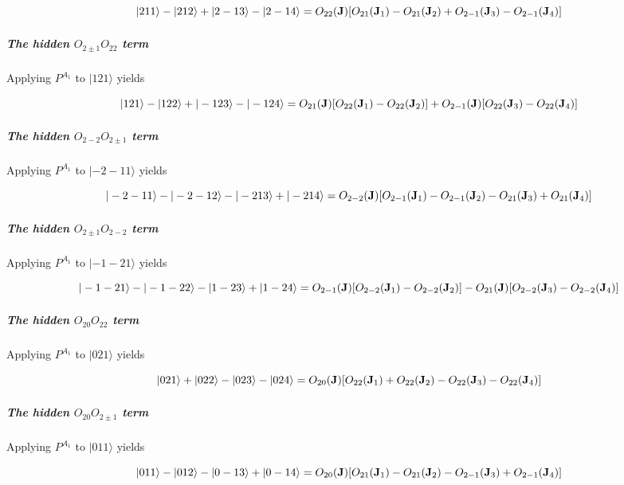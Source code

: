 \begin{equation}\label{nn211}
|211\rangle-|212\rangle+|2-13\rangle-|2-14\rangle =
O_{22}(\mathbf J)[O_{21}(\mathbf J_1)-O_{21}(\mathbf J_2)+O_{2-1}(\mathbf J_3)-O_{2-1}(\mathbf J_4)]
\end{equation}
   

\subparagraph{The hidden $O_{2\pm1}O_{22}$ term}

Applying $P^{A_1}$ to $|121\rangle$ yields 

\begin{equation}\label{nn121}
|121\rangle-|122\rangle+|-123\rangle-|-124\rangle =
O_{21}(\mathbf J)[O_{22}(\mathbf J_1)-O_{22}(\mathbf J_2)]+O_{2-1}(\mathbf J)[O_{22}(\mathbf J_3)-O_{22}(\mathbf J_4)]
\end{equation}
   
\subparagraph{The hidden $O_{2-2}O_{2\pm1}$ term}

Applying $P^{A_1}$ to $|-2-11\rangle$ yields 

\begin{equation}
|-2-11\rangle-|-2-12\rangle-|-213\rangle+|-214\rangle =
O_{2-2}(\mathbf J)[O_{2-1}(\mathbf J_1)-O_{2-1}(\mathbf J_2)-O_{21}(\mathbf J_3)+O_{21}(\mathbf J_4)]
\end{equation}
 

\subparagraph{The hidden $O_{2\pm1}O_{2-2}$ term}

Applying $P^{A_1}$ to $|-1-21\rangle$ yields 

\begin{equation}
|-1-21\rangle-|-1-22\rangle-|1-23\rangle+|1-24\rangle =
O_{2-1}(\mathbf J)[O_{2-2}(\mathbf J_1)-O_{2-2}(\mathbf J_2)]-O_{21}(\mathbf J)[O_{2-2}(\mathbf J_3)-O_{2-2}(\mathbf J_4)]
\end{equation}
   


  \subparagraph{The hidden $O_{20}O_{22}$ term}

Applying $P^{A_1}$ to $|021\rangle$ yields 

\begin{equation}
|021\rangle+|022\rangle-|023\rangle-|024\rangle =
O_{20}(\mathbf J)[O_{22}(\mathbf J_1)+O_{22}(\mathbf J_2)-O_{22}(\mathbf J_3)-O_{22}(\mathbf J_4)]
\end{equation}
   

\subparagraph{The hidden $O_{20}O_{2\pm1}$ term}

Applying $P^{A_1}$ to $|011\rangle$ yields 

\begin{equation}
|011\rangle-|012\rangle-|0-13\rangle+|0-14\rangle =
O_{20}(\mathbf J)[O_{21}(\mathbf J_1)-O_{21}(\mathbf J_2)-O_{2-1}(\mathbf J_3)+O_{2-1}(\mathbf J_4)]
\end{equation}
    

